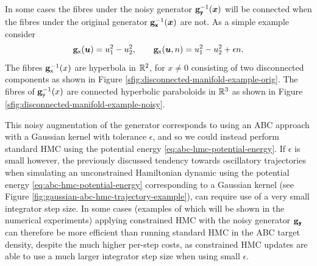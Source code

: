 In some cases the fibres under the noisy generator ${\mathbf{g}}_{\boldsymbol{\mathsf{y}}}^{-1}(\boldsymbol{x})$ will be connected when the fibres under the original generator ${\mathbf{g}}_{\boldsymbol{\mathsf{x}}}^{-1}(\boldsymbol{x})$ are not. As a simple example consider
\begin{equation}\label{eq:disconnected-manifold-example}
  {\mathbf{g}}_{\mathsf{x}}(\boldsymbol{u}) = u_1^2 - u_2^2,
  \qquad
  {\mathbf{g}}_{\mathsf{x}}(\boldsymbol{u}, n) = u_1^2 - u_2^2 + \epsilon n.
\end{equation}
The fibres ${\mathbf{g}}_{\mathsf{x}}^{-1}(x)$ are hyperbola in $\mathbb{R}^2$, for $x \neq 0$ consisting of two disconnected components as shown in Figure \ref{sfig:disconnected-manifold-example-orig}. The fibres of ${\mathbf{g}}_{\mathsf{y}}^{-1}(x)$ are connected hyperbolic paraboloids in $\mathbb{R}^3$ as shown in Figure \ref{sfig:disconnected-manifold-example-noisy}.

This noisy augmentation of the generator corresponds to using an \ac{ABC} approach with a Gaussian kernel with tolerance $\epsilon$, and so we could instead perform standard \ac{HMC} using the potential energy \eqref{eq:abc-hmc-potential-energy}. If $\epsilon$ is small however, the previously discussed tendency towards oscillatory trajectories when simulating an unconstrained Hamiltonian dynamic using the potential energy \eqref{eq:abc-hmc-potential-energy} corresponding to a Gaussian kernel (see Figure \ref{fig:gaussian-abc-hmc-trajectory-example}), can require use of a very small integrator step size. In some cases (examples of which will be shown in the numerical experiments) applying constrained \ac{HMC} with the noisy generator ${\mathbf{g}}_{\boldsymbol{\mathsf{y}}}$ can therefore be more efficient than running standard \ac{HMC} in the \ac{ABC} target density, despite the much higher per-step costs, as constrained \ac{HMC} updates are able to use a much larger integrator step size when using small $\epsilon$. 

